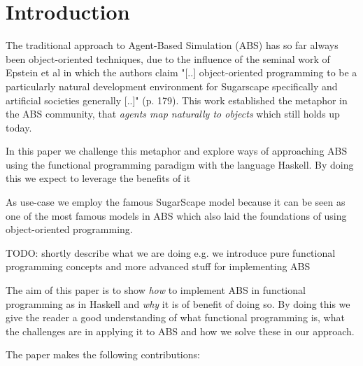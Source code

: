 \section{Introduction}
The traditional approach to Agent-Based Simulation (ABS) has so far always been object-oriented techniques, due to the influence of the seminal work of Epstein et al \cite{epstein_growing_1996} in which the authors claim "[..] object-oriented programming to be a particularly natural development environment for Sugarscape specifically and artificial societies generally [..]" (p. 179). This work established the metaphor in the ABS community, that \textit{agents map naturally to objects} \citep{north_managing_2007} which still holds up today.

In this paper we challenge this metaphor and explore ways of approaching ABS using the functional programming paradigm with the language Haskell. By doing this we expect to leverage the benefits of it %

As use-case we employ the famous SugarScape model \citep{epstein_growing_1996} because it can be seen as one of the most famous models in ABS which also laid the foundations of using object-oriented programming.

TODO: shortly describe what we are doing e.g. we introduce pure functional programming concepts and more advanced stuff for implementing ABS

The aim of this paper is to show \textit{how} to implement ABS in functional programming as in Haskell and \textit{why} it is of benefit of doing so. By doing this we give the reader a good understanding of what functional programming is, what the challenges are in applying it to ABS and how we solve these in our approach. 

The paper makes the following contributions:


